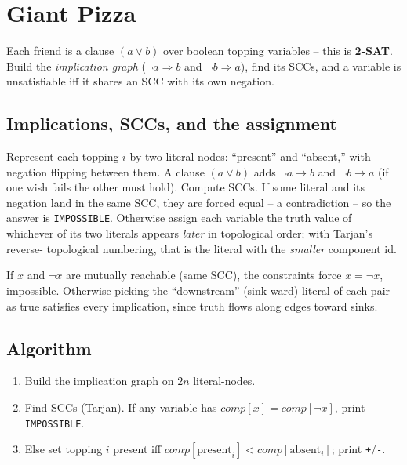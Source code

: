 \section{Giant Pizza}
\label{sec:cses-giant-pizza}


\begin{patternbox}
Each friend is a clause $(a\lor b)$ over boolean topping variables -- this is
\textbf{2-SAT}. Build the \emph{implication graph} ($\lnot a\Rightarrow b$
and $\lnot b\Rightarrow a$), find its SCCs, and a variable is unsatisfiable
iff it shares an SCC with its own negation.
\end{patternbox}

\subsection*{Implications, SCCs, and the assignment}

Represent each topping $i$ by two literal-nodes: ``present'' and
``absent,'' with negation flipping between them. A clause $(a\lor b)$ adds
$\lnot a\to b$ and $\lnot b\to a$ (if one wish fails the other must hold).
Compute SCCs. If some literal and its negation land in the same SCC, they
are forced equal -- a contradiction -- so the answer is \texttt{IMPOSSIBLE}.
Otherwise assign each variable the truth value of whichever of its two
literals appears \emph{later} in topological order; with Tarjan's reverse-
topological numbering, that is the literal with the \emph{smaller} component
id.

\begin{ideabox}
If $x$ and $\lnot x$ are mutually reachable (same SCC), the constraints
force $x=\lnot x$, impossible. Otherwise picking the ``downstream''
(sink-ward) literal of each pair as true satisfies every implication, since
truth flows along edges toward sinks.
\end{ideabox}

\subsection*{Algorithm}

\begin{enumerate}
  \item Build the implication graph on $2n$ literal-nodes.
  \item Find SCCs (Tarjan). If any variable has $\textit{comp}[x]=
        \textit{comp}[\lnot x]$, print \texttt{IMPOSSIBLE}.
  \item Else set topping $i$ present iff $\textit{comp}[\text{present}_i]<
        \textit{comp}[\text{absent}_i]$; print \texttt{+}/\texttt{-}.
\end{enumerate}

